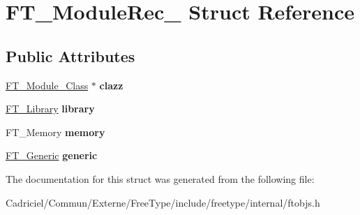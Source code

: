 \hypertarget{struct_f_t___module_rec__}{}\section{F\+T\+\_\+\+Module\+Rec\+\_\+ Struct Reference}
\label{struct_f_t___module_rec__}
\subsection*{Public Attributes}
\begin{DoxyCompactItemize}
\item 
\hyperlink{struct_f_t___module___class__}{F\+T\+\_\+\+Module\+\_\+\+Class} $\ast$ {\bfseries clazz}\hypertarget{struct_f_t___module_rec___ac762573dc13af2d2af190a9e855742f5}{}\label{struct_f_t___module_rec___ac762573dc13af2d2af190a9e855742f5}

\item 
\hyperlink{struct_f_t___library_rec__}{F\+T\+\_\+\+Library} {\bfseries library}\hypertarget{struct_f_t___module_rec___ac3d04fbdc2988bf9a39f4ad6d3cb4b5f}{}\label{struct_f_t___module_rec___ac3d04fbdc2988bf9a39f4ad6d3cb4b5f}

\item 
F\+T\+\_\+\+Memory {\bfseries memory}\hypertarget{struct_f_t___module_rec___a33113e9eb2d6cd8ee6666da75ff8e108}{}\label{struct_f_t___module_rec___a33113e9eb2d6cd8ee6666da75ff8e108}

\item 
\hyperlink{struct_f_t___generic__}{F\+T\+\_\+\+Generic} {\bfseries generic}\hypertarget{struct_f_t___module_rec___a860be13b9f239c42cacdbc5d6f81d44a}{}\label{struct_f_t___module_rec___a860be13b9f239c42cacdbc5d6f81d44a}

\end{DoxyCompactItemize}


The documentation for this struct was generated from the following file\+:\begin{DoxyCompactItemize}
\item 
Cadriciel/\+Commun/\+Externe/\+Free\+Type/include/freetype/internal/ftobjs.\+h\end{DoxyCompactItemize}
